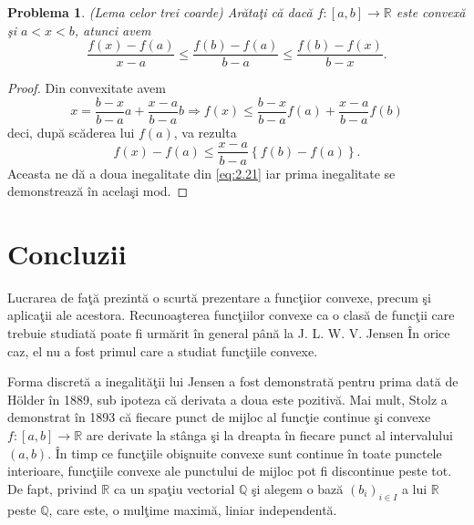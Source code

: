 \documentclass[a4paper,12pt,oneside]{report}
\newtheorem{problem}{Problema}
\begin{document}
\begin{problem} (Lema celor trei coarde)
Ar\u{a}ta\c{t}i c\u{a} dac\u{a} \(f : \left [ a,b \right ]  \to \mathbb{R}\) este convex\u{a} \c{s}i \(a <  x < b\), atunci avem
\begin{displaymath}
    \frac{f\left ( x \right ) - f\left ( a \right )}{x - a} \leq \frac{f\left ( b \right ) - f\left ( a \right )}{b - a} \leq  \frac{f\left ( b \right ) - f\left ( x \right )}{b - x}.   \label{eq:2.21}\tag{2.21}
\end{displaymath}
\end{problem}
\begin{proof}
Din convexitate avem
\begin{displaymath}
    x = \frac{b - x}{b - a}a + \frac{x - a}{b - a }b \Rightarrow f\left ( x \right ) \leq \frac{b - x}{b - a}f\left ( a \right ) + \frac{x - a}{b - a }f\left ( b \right )
\end{displaymath}
 deci, dup\u{a} sc\u{a}derea lui \(f\left ( a \right )\), va rezulta
 \begin{displaymath}
     f\left ( x \right ) - f\left ( a \right )\leq \frac{x - a}{b - a }\left \{ f\left ( b \right ) - f\left ( a \right ) \right \}. \label{eq:2.22} \tag{2.22}
 \end{displaymath}
Aceasta ne d\u{a} a doua inegalitate din \ref{eq:2.21} iar prima inegalitate se demonstreaz\u{a} \^{i}n acela\c{s}i mod.
\end{proof}

\chapter* {Concluzii}

Lucrarea de fa\c{t}\u{a} prezint\u{a} o scurt\u{a} prezentare a func\c{t}iior convexe, precum \c{s}i aplica\c{t}ii ale acestora.  Recunoa\c{s}terea func\c{t}iilor convexe ca o clas\u{a} de func\c{t}ii care trebuie studiat\u{a} poate fi urm\u{a}rit \^{i}n general p\^{a}n\u{a} la  J. L. W. V. Jensen \^{I}n orice caz, el nu a fost primul care a studiat funcţiile convexe. 

 Forma discret\u{a} a inegalit\u{a}\c{t}ii lui Jensen a fost demonstrat\u{a} pentru prima dat\u{a} de Hölder \^{i}n 1889, sub ipoteza c\u{a} derivata a doua este pozitiv\u{a}. Mai mult, Stolz a demonstrat \^{i}n 1893 c\u{a} fiecare punct de mijloc al func\c{t}ie continue \c{s}i convexe \(f : \left [ a,b \right ] \rightarrow \mathbb{R}\) are derivate la st\^{a}nga \c{s}i la dreapta \^{i}n fiecare punct al intervalului \(\left ( a,b \right )\). \^{I}n timp ce func\c{t}iile obi\c{s}nuite convexe sunt continue \^{i}n toate punctele interioare,  func\c{t}iile convexe ale punctului de mijloc pot fi discontinue peste tot. De fapt, privind \(\mathbb{R}\) ca un spa\c{t}iu vectorial \(\mathbb{Q}\) \c{s}i alegem o baz\u{a} \(\left ( b_{i} \right )_{i \in I}\) a lui \(\mathbb{R}\) peste \(\mathbb{Q}\), care este, o mul\c{t}ime maxim\u{a}, liniar independent\u{a}.
 
\end{document}
